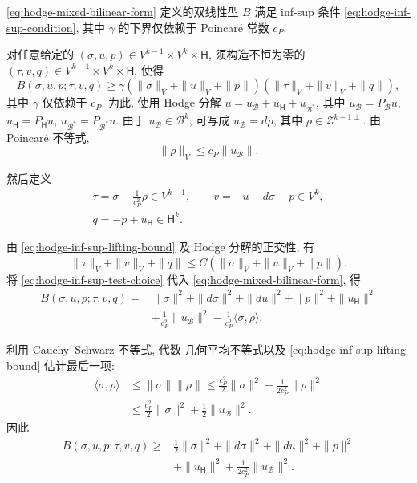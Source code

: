 \begin{Theorem}\label{thm:hodge-mixed-inf-sup}
\eqref{eq:hodge-mixed-bilinear-form} 定义的双线性型 $B$ 满足 inf-sup 条件 \eqref{eq:hodge-inf-sup-condition}, 其中 $\gamma$ 的下界仅依赖于 Poincaré 常数 $c_P$.
\end{Theorem}

\begin{Proof}
对任意给定的 $(\sigma,u,p)\in V^{k-1}\times V^k\times\mathsf H$, 须构造不恒为零的 $(\tau,v,q)\in V^{k-1}\times V^k\times\mathsf H$, 使得
\[
B(\sigma,u,p;\tau,v,q)\geq\gamma(\|\sigma\|_V+\|u\|_V+\|p\|)(\|\tau\|_V+\|v\|_V+\|q\|),
\]
其中 $\gamma$ 仅依赖于 $c_P$. 为此, 使用 Hodge 分解 $u=u_{\mathcal B}+u_{\mathsf H}+u_{\mathcal B^*}$, 其中 $u_{\mathcal B}=P_{\mathcal B}u$, $u_{\mathsf H}=P_{\mathsf H}u$, $u_{\mathcal B^*}=P_{\mathcal B^*}u$. 由于 $u_{\mathcal B}\in\mathcal B^k$, 可写成 $u_{\mathcal B}=d\rho$, 其中 $\rho\in\mathcal Z^{k-1\perp}$. 由 Poincaré 不等式,
\begin{equation}\label{eq:hodge-inf-sup-lifting-bound}
\|\rho\|_V\leq c_P\|u_{\mathcal B}\|.
\end{equation}

然后定义
\begin{equation}\label{eq:hodge-inf-sup-test-choice}
\begin{gathered}
\tau=\sigma-\frac{1}{c_P^2}\rho\in V^{k-1},\qquad v=-u-d\sigma-p\in V^k,\\
q=-p+u_{\mathsf H}\in\mathsf H^k.
\end{gathered}
\end{equation}

由 \eqref{eq:hodge-inf-sup-lifting-bound} 及 Hodge 分解的正交性, 有
\begin{equation}\label{eq:hodge-inf-sup-test-bound}
\|\tau\|_V+\|v\|_V+\|q\|\leq C(\|\sigma\|_V+\|u\|_V+\|p\|).
\end{equation}
将 \eqref{eq:hodge-inf-sup-test-choice} 代入 \eqref{eq:hodge-mixed-bilinear-form}, 得
\[
\begin{aligned}
B(\sigma,u,p;\tau,v,q)={}&\|\sigma\|^2+\|d\sigma\|^2+\|du\|^2+\|p\|^2+\|u_{\mathsf H}\|^2\\
&+\frac{1}{c_P^2}\|u_{\mathcal B}\|^2-\frac{1}{c_P^2}\langle\sigma,\rho\rangle.
\end{aligned}
\]

利用 Cauchy–Schwarz 不等式, 代数-几何平均不等式以及 \eqref{eq:hodge-inf-sup-lifting-bound} 估计最后一项:
\[
\begin{aligned}
\langle\sigma,\rho\rangle&\leq\|\sigma\|\|\rho\|\leq\frac{c_P^2}{2}\|\sigma\|^2+\frac{1}{2c_P^2}\|\rho\|^2\\
&\leq\frac{c_P^2}{2}\|\sigma\|^2+\frac12\|u_{\mathcal B}\|^2.
\end{aligned}
\]
因此
\[
\begin{aligned}
B(\sigma,u,p;\tau,v,q)\geq{}&\frac12\|\sigma\|^2+\|d\sigma\|^2+\|du\|^2+\|p\|^2\\
&+\|u_{\mathsf H}\|^2+\frac{1}{2c_P^2}\|u_{\mathcal B}\|^2.
\end{aligned}
\]


\end{Proof}
